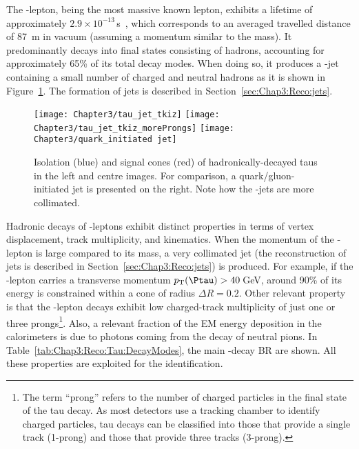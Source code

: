 The \Ptau-lepton, being the most massive known lepton, exhibits a lifetime of approximately 
$2.9 \times 10^{-13}\,$s~\cite{Belle:2013teo}, which corresponds to an averaged travelled 
distance of 87~\textmu m in vacuum (assuming a momentum similar to the \Ptau mass). 
It predominantly decays into final states 
consisting of hadrons, accounting for approximately 65\% of its total decay modes. 
When doing so, it produces a \Ptau-jet containing a small number of
charged and neutral hadrons as it is shown in Figure~\ref{fig:Chap3:tau_jet}.
The formation of jets is described in Section~\ref{sec:Chap3:Reco:jets}.

\begin{figure}[h]
	\centering
 	 \texttt{[image: Chapter3/tau\_jet\_tkiz]}
	 \hspace{0.05\textwidth}
	 \texttt{[image: Chapter3/tau\_jet\_tkiz\_moreProngs]}
	 \hspace{0.05\textwidth}
	 \texttt{[image: Chapter3/quark\_initiated jet]}
	 \caption{Isolation (blue) and signal cones (red) of hadronically-decayed taus in the left
	 and centre images. For comparison, a quark/gluon-initiated jet is presented on the right.
	 Note how the \Ptau-jets are more collimated.}
	\label{fig:Chap3:tau_jet}
\end{figure}

Hadronic decays of \Ptau-leptons exhibit distinct properties in terms of vertex displacement, track multiplicity, and kinematics. 
When the momentum of the \Ptau-lepton is large compared to its mass, a very collimated jet 
(the reconstruction of jets is described in Section~\ref{sec:Chap3:Reco:jets}) is
produced. %
For example, if the \Ptau-lepton carries a transverse momentum $\pT(\Ptau)>40\,$GeV, around
90\% of its energy is constrained within a cone of radius $\Delta R=0.2$. Other relevant property is that the \Ptau-lepton
decays exhibit low charged-track multiplicity of just one or three prongs\footnote{The term ``prong'' refers to 
the number of charged particles in the final state of the tau decay. As most detectors use a tracking chamber 
to identify charged particles, tau decays can be classified into those that provide a single track (1-prong) 
and those that provide three tracks (3-prong).}. Also, a relevant fraction of the EM energy 
deposition in the calorimeters is due to photons coming from the decay of neutral pions. %
In Table~\ref{tab:Chap3:Reco:Tau:DecayModes},
the main \Ptau-decay BR are shown. All these properties are exploited for the \tauhad identification.
 
